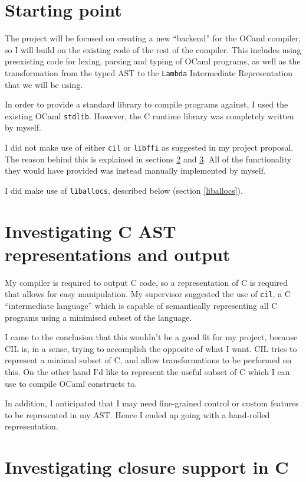 \documentclass[12pt,a4paper,twoside,openright]{report}
\begin{document}
\section{Starting point}

The project will be focused on creating a new ``backend'' for the OCaml
compiler, so I will build on the existing code of the rest of the compiler.
This includes using preexisting code for lexing, parsing and typing of OCaml programs, as
well as the transformation from the typed AST to the \lstinline!Lambda! Intermediate
Representation that we will be using.

In order to provide a standard library to compile programs against, I used
the existing OCaml \lstinline{stdlib}. However, the C runtime
library was completely written by myself.

I did not make use of either \lstinline{cil} or \lstinline{libffi} as suggested
in my project proposal. The reason behind this is explained in sections
\ref{investigating-c-ast} and \ref{investigating-closure}. All of the
functionality they would have provided was instead manually implemented by
myself.

I did make use of \lstinline!liballocs!, described below (section \ref{liballocs}).

\section{Investigating C AST representations and output}\label{investigating-c-ast}

My compiler is required to output C code, so a representation of C
is required that allows for easy manipulation. My supervisor suggested the
use of \lstinline!cil!, a C ``intermediate language'' which is capable of
semantically representing all C programs using a minimised subset of the language.

I came to the conclusion that this wouldn't be a good fit for my project, because
 CIL is, in a sense, trying to accomplish the opposite of what I want. CIL
 tries to represent a minimal subset of C, and allow transformations to be
 performed on this. On the other hand I'd like to represent the useful subset
 of C which I can use to compile OCaml constructs to.

In addition, I anticipated that I may need fine-grained control or custom
features to be represented in my AST. Hence I ended up going with a hand-rolled
representation.


\section{Investigating closure support in C}\label{investigating-closure}
\end{document}
